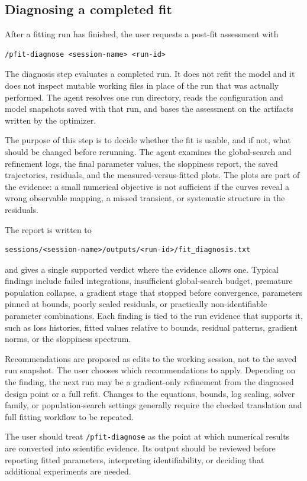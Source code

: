 \subsection{Diagnosing a completed fit}
\label{sec:pfit-diagnose}

After a fitting run has finished, the user requests a post-fit assessment with

\begin{verbatim}
/pfit-diagnose <session-name> <run-id>
\end{verbatim}

The diagnosis step evaluates a completed run. It does not refit the model and
it does not inspect mutable working files in place of the run that was actually
performed. The agent resolves one run directory, reads the configuration and
model snapshots saved with that run, and bases the assessment on the artifacts
written by the optimizer.

The purpose of this step is to decide whether the fit is usable, and if not,
what should be changed before rerunning. The agent examines the global-search
and refinement logs, the final parameter values, the sloppiness report, the
saved trajectories, residuals, and the measured-versus-fitted plots. The plots
are part of the evidence: a small numerical objective is not sufficient if the
curves reveal a wrong observable mapping, a missed transient, or systematic
structure in the residuals.

The report is written to

\begin{verbatim}
sessions/<session-name>/outputs/<run-id>/fit_diagnosis.txt
\end{verbatim}

and gives a single supported verdict where the evidence allows one. Typical
findings include failed integrations, insufficient global-search budget,
premature population collapse, a gradient stage that stopped before convergence,
parameters pinned at bounds, poorly scaled residuals, or practically
non-identifiable parameter combinations. Each finding is tied to the run
evidence that supports it, such as loss histories, fitted values relative to
bounds, residual patterns, gradient norms, or the sloppiness spectrum.

Recommendations are proposed as edits to the working session, not to the saved
run snapshot. The user chooses which recommendations to apply. Depending on the
finding, the next run may be a gradient-only refinement from the diagnosed design
point or a full refit. Changes to the equations, bounds, log scaling, solver
family, or population-search settings generally require the checked translation
and full fitting workflow to be repeated.

The user should treat \texttt{/pfit-diagnose} as the point at which numerical
results are converted into scientific evidence. Its output should be reviewed
before reporting fitted parameters, interpreting identifiability, or deciding
that additional experiments are needed.
